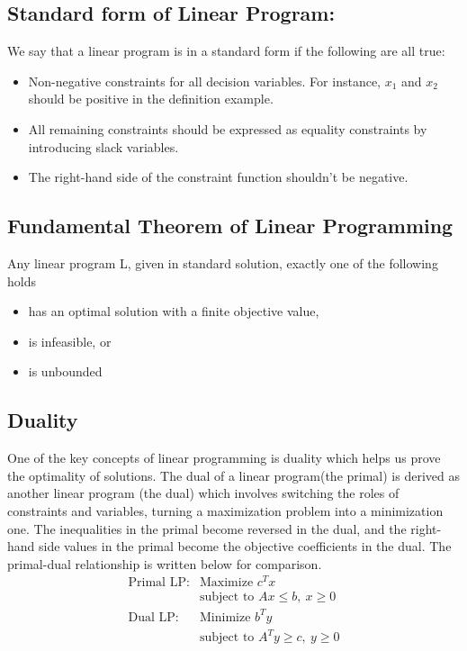 \subsection{Standard form of Linear Program:}
We say that a linear program is in a standard form if the following are all true: 
\begin{itemize}
\item Non-negative constraints for all decision variables. For instance, $x_1$ and $x_2$ should be positive in the definition example.
\item All remaining constraints should be expressed as equality 
constraints by introducing slack 
variables. 
\item The right-hand side of the constraint function shouldn't be negative.
\end{itemize}

\subsection{Fundamental Theorem of Linear Programming}

Any linear program L, given in standard solution, exactly one of the following holds
\begin{itemize}
    \item has an optimal solution with a finite objective value, 
    \item is infeasible, or
    \item is unbounded
\end{itemize}
    
\subsection{Duality}

One of the key concepts of linear programming is duality which helps us prove the optimality of solutions. The dual of a linear program(the primal) is derived as another linear program (the dual) which involves switching the roles of constraints and variables, turning a maximization problem into a minimization one. The inequalities in the primal become reversed in the dual, and the right-hand side values in the primal become the objective coefficients in the dual. The primal-dual relationship is written below for comparison. \cite{GE}
\[
\begin{array}{rl}
\text{Primal LP:} & \text{Maximize } c^T x \\
                  & \text{subject to } Ax \leq b, \ x \geq 0 \\
\hline
\text{Dual LP:}   & \text{Minimize } b^T y \\
                  & \text{subject to } A^T y \geq c, \ y \geq 0
\end{array}
\]

